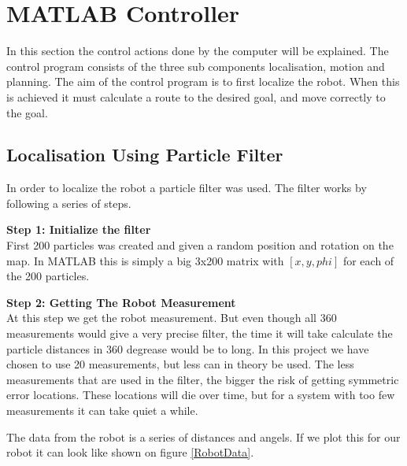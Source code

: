 \section{MATLAB Controller}
In this section the control actions done by the computer will be explained. The control program consists of the three sub components localisation, motion and planning. The aim of the control program is to first localize the robot. When this is achieved it must calculate a route to the desired goal, and move correctly to the goal. 



\subsection{Localisation Using Particle Filter}
In order to localize the robot a particle filter was used. The filter works by following a series of steps. 

\textbf{Step 1: Initialize the filter}\\
First 200 particles was created and given a random position and rotation on the map. In MATLAB this is simply a big 3x200 matrix with $[x, y, phi]$ for each of the 200 particles. 

\textbf{Step 2: Getting The Robot Measurement}\\
At this step we get the robot measurement. But even though all 360 measurements would give a very precise filter, the time it will take calculate the particle distances in 360 degrease would be to long. In this project we have chosen to use 20 measurements, but less can in theory be used. The less measurements that are used in the filter, the bigger the risk of getting symmetric error locations. These locations will die over time, but for a system with too few measurements it can take quiet a while. 

The data from the robot is a series of distances and angels. If we plot this for our robot it can look like shown on figure \ref{RobotData}.

